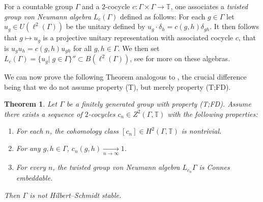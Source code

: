 \documentclass[11pt]{amsart}
\newcommand{\T}{{\mathbb{T}}}
\newcommand{\C}{{\mathbb{C}}}
\newcommand{\cN}{{\mathcal{N}}}
\newtheorem{theorem}{Theorem}[section]
\theoremstyle{definition}
\theoremstyle{remark}
\theoremstyle{definition}
\newcommand{\admid}[1]{\begingroup\color{orange}Alon: #1\endgroup}
\begin{document}
    
For a countable group $\Gamma$ and a $2$-cocycle $c: \Gamma \times \Gamma \to \T$, one associates a \emph{twisted group von Neumann algebra} $L_c(\Gamma)$ defined as follows:
For each $g \in \Gamma$ let $u_g \in U(\ell^2(\Gamma))$ be the unitary defined by $u_g \cdot \delta_h = c(g,h) \delta_{gh}$.
It then follows that $g \mapsto u_g$ is a projective unitary representation with associated cocycle $c$, that is $u_g u_h = c(g,h) u_{gh}$ for all $g,h \in \Gamma$. We then set $L_c(\Gamma) = \{ u_g | \; g\in \Gamma\}'' \subset B(\ell^2(\Gamma))$, see \cite[Section 2.1]{Dog} for more on these algebras. 

We can now prove the following Theorem analogous to \cite[Theorem 3.1]{Dog}, the crucial difference being that we do not assume property (T), but merely property (T;FD).
\begin{theorem} \label{thm:Ioana_analog}
Let $\Gamma$ be a finitely generated group with property (T;FD). Assume there exists a sequence of $2$-cocycles 
$c_n \in Z^2(\Gamma, \T)$ with the following properties:

\begin{enumerate}
    \item For each $n$, the cohomology class $[c_n] \in H^2(\Gamma, \T)$ is nontrivial.
    \item For any $g,h \in \Gamma$, $c_n(g,h) \xrightarrow[n \to \infty]{} 1$.
    \item For every $n$, the twisted group von Neumann algebra $L_{c_n}\Gamma$ is Connes embeddable.
\end{enumerate}
Then $\Gamma$ is not Hilbert--Schmidt stable.
\end{theorem}
\end{document}

